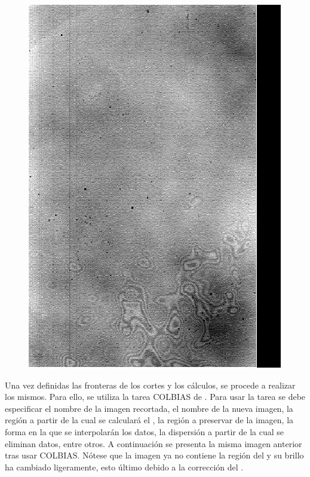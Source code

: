 \documentclass[12pt]{article}
\begin{document}
\begin{figure}[H]
  \centering
   \includegraphics[scale= 0.4]{im02.png}
  \label{im02}
\end{figure}
\vspace{1cm}

Una vez definidas las fronteras de los cortes y los cálculos, se procede a realizar los mismos. Para ello, se utiliza la tarea COLBIAS de .
Para usar la tarea se debe especificar el nombre de la imagen recortada, el nombre de la nueva imagen, la región a partir de la cual se calculará el , la región a preservar de la imagen, la forma en la que se interpolarán los datos, la dispersión a partir de la cual se eliminan datos, entre otros. A continuación se presenta la misma imagen anterior tras usar COLBIAS. Nótese que la imagen ya no contiene la región del  y su brillo ha cambiado ligeramente, esto último debido a la corrección del .
\end{document}
